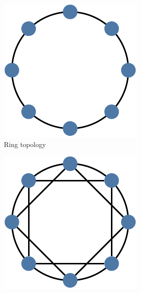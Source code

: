 \begin{figure}[t]
    \begin{subfigure}[t]{0.3\textwidth}
        \includegraphics[width=\textwidth]{img/master_neigh_ring.pdf}
        \caption{Ring topology}
        \label{fig:topologyring}
    \end{subfigure}
    \hfill
    \begin{subfigure}[t]{0.3\textwidth}
        \includegraphics[width=\textwidth]{img/master_neigh_densering.pdf}

\end{subfigure}
\end{figure}
